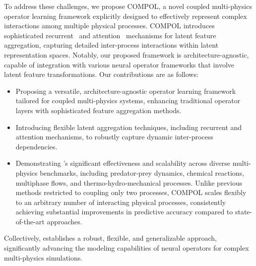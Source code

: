 To address these challenges, we propose COMPOL, a novel coupled multi-physics operator learning framework explicitly designed to effectively represent complex interactions among multiple physical processes. COMPOL introduces sophisticated recurrent~\citep{cho2014learning} and attention~\citep{vaswani2017attention} mechanisms for latent feature aggregation, capturing detailed inter-process interactions within latent representation spaces. Notably, our proposed framework is architecture-agnostic, capable of integration with various neural operator frameworks that involve latent feature transformations. Our contributions are as follows:
\begin{itemize}
	\item  Proposing a versatile, architecture-agnostic operator learning framework tailored for coupled multi-physics systems, enhancing traditional operator layers with sophisticated feature aggregation methods.
	\item Introducing flexible latent aggregation techniques, including recurrent and attention mechanisms, to robustly capture dynamic inter-process dependencies.
	\item Demonstrating \ours's significant effectiveness and scalability across diverse multi-physics benchmarks, including predator-prey dynamics, chemical reactions, multiphase flows, and thermo-hydro-mechanical processes. Unlike previous methods restricted to coupling only two processes, COMPOL scales flexibly to an arbitrary number of interacting physical processes, consistently achieving substantial improvements in predictive accuracy compared to state-of-the-art approaches.
\end{itemize}
Collectively, \ours establishes a robust, flexible, and generalizable approach, significantly advancing the modeling capabilities of neural operators for complex multi-physics simulations.



 





